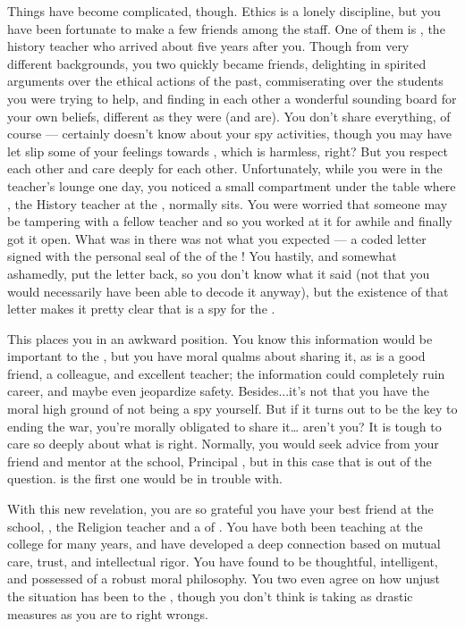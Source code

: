 \documentclass[char]{GL2020}
\begin{document}
Things have become complicated, though. Ethics is a lonely discipline, but you have been fortunate to make a few friends among the staff. One of them is \cHistory{\full}, the history teacher who arrived about five years after you. Though from very different backgrounds, you two quickly became friends, delighting in spirited arguments over the ethical actions of the past, commiserating over the students you were trying to help, and finding in each other a wonderful sounding board for your own beliefs, different as they were (and are). You don’t share everything, of course — \cHistory{\they} certainly doesn’t know about your spy activities, though you may have let slip some of your feelings towards \cBeetle{}, which is harmless, right? But you respect each other and care deeply for each other. Unfortunately, while you were in the teacher’s lounge one day, you noticed a small compartment under the table where \cHistory{}, the History teacher at the \pSchool{},  normally sits. You were worried that someone may be tampering with a fellow teacher and so you worked at it for awhile and finally got it open. What was in there was not what you expected — a coded letter signed with the personal seal of the \cQueen{\Monarch} of the \pFarm{}! You hastily, and somewhat ashamedly, put the letter back, so you don’t know what it said (not that you would necessarily have been able to decode it anyway), but the existence of that letter makes it pretty clear that \cHistory{} is a spy for the \cQueen{\Monarch}.

This places you in an awkward position. You know this information would be important to the \pShip{}, but you have moral qualms about sharing it, as \cHistory{} is a good friend, a colleague, and excellent teacher; the information could completely ruin \cHistory{\their} career, and maybe even jeopardize \cHistory{\their} safety. Besides...it's not that you have the moral high ground of not being a spy yourself. But if it turns out to be the key to ending the war, you're morally obligated to share it\ldots{} aren't you? It is tough to care so deeply about what is right. Normally, you would seek advice from your friend and mentor at the school, Principal \cPrincipal{\full}, but in this case that is out of the question. \cPrincipal{} is the first one \cHistory{} would be in trouble with.

With this new revelation, you are so grateful you have your best friend at the school, \cBeetle{\full}, the Religion teacher and a \cBeetle{\cleric} of \cTechGod{}. You have both been teaching at the college for many years, and have developed a deep connection based on mutual care, trust, and intellectual rigor. You have found \cBeetle{\them} to be thoughtful, intelligent, and possessed of a robust moral philosophy. You two even agree on how unjust the situation has been to the \pShippies{}, though you don’t think \cBeetle{} is taking as drastic measures as you are to right wrongs. 
\end{document}
